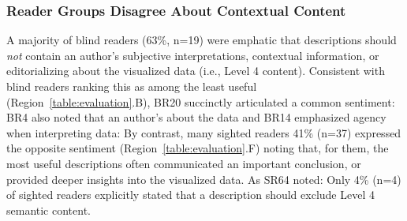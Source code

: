 \subsubsection{Reader Groups Disagree About Contextual Content}
\label{section:qualResultsB}
A majority of blind readers ({63}\%, n=19) were emphatic that descriptions should \emph{not} contain an author's subjective interpretations, contextual information, or editorializing about the visualized data (i.e., Level 4 content).
Consistent with blind readers ranking this as among the least useful (Region~\ref{table:evaluation}.B), BR20 succinctly articulated a common sentiment:  BR4 also noted that an author's  about the data  and BR14 emphasized {agency} when interpreting data: 
By contrast, many sighted readers {41}\% (n={37}) expressed the opposite sentiment (Region~\ref{table:evaluation}.F) noting that, for them, the most useful descriptions often  communicated an important conclusion, or provided deeper insights into the visualized data.
As SR64 noted: 
Only {4}\% (n={4}) of sighted readers explicitly stated that a description should exclude Level 4 semantic content.

